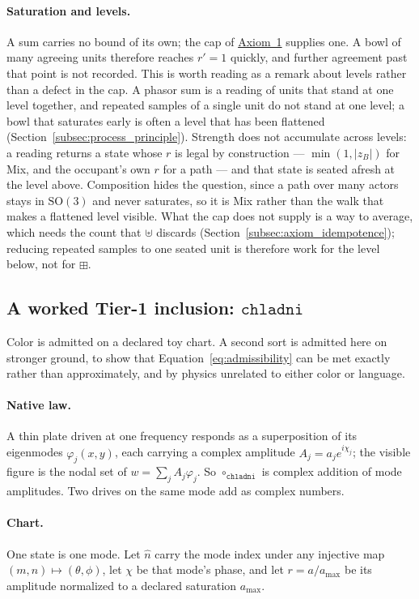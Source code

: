 \documentclass[12pt, a4paper]{article}
\begin{document}
\paragraph{Saturation and levels.}
A sum carries no bound of its own; the cap of
\hyperref[subsec:axiom1]{Axiom~1} supplies one. A bowl of many agreeing units
therefore reaches $r'=1$ quickly, and further agreement past that
point is not recorded. This is worth reading as a remark about levels
rather than a defect in the cap. A phasor sum is a reading of units
that stand at one level together, and repeated samples of a single
unit do not stand at one level; a bowl that saturates early is often a
level that has been flattened
(Section~\ref{subsec:process_principle}). Strength does not
accumulate across levels: a reading returns a state whose $r$ is legal
by construction --- $\min(1,|z_B|)$ for Mix, and the occupant's own
$r$ for a path --- and that state is seated afresh at the level above.
Composition hides the question, since a path over many actors stays in
$\mathrm{SO}(3)$ and never saturates, so it is Mix rather than the
walk that makes a flattened level visible. What the cap does not
supply is a way to average, which needs the count that $\uplus$
discards (Section~\ref{subsec:axiom_idempotence}); reducing repeated
samples to one seated unit is therefore work for the level below, not
for $\boxplus$.

\subsection{A worked Tier-1 inclusion: \texorpdfstring{$\mathtt{chladni}$}{chladni}}
\label{subsec:chladni_inclusion}
Color is admitted on a declared toy chart. A second sort is admitted
here on stronger ground, to show that
Equation~\eqref{eq:admissibility} can be met exactly rather than
approximately, and by physics unrelated to either color or language.

\paragraph{Native law.}
A thin plate driven at one frequency responds as a superposition of
its eigenmodes $\varphi_j(x,y)$, each carrying a complex amplitude
$A_j=a_j e^{i\chi_j}$; the visible figure is the nodal set of
$w=\sum_j A_j\varphi_j$. So $\circ_{\mathtt{chladni}}$ is complex
addition of mode amplitudes. Two drives on the same mode add as
complex numbers.

\paragraph{Chart.}
One state is one mode. Let $\hat n$ carry the mode index under any
injective map $(m,n)\mapsto(\theta,\phi)$, let $\chi$ be that mode's
phase, and let $r=a/a_{\max}$ be its amplitude normalized to a
declared saturation $a_{\max}$.
\end{document}
